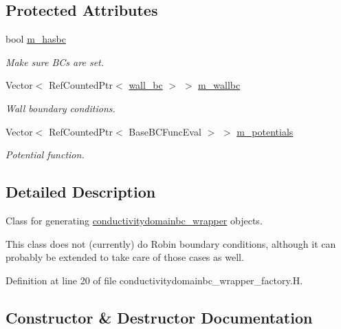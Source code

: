 \subsection*{Protected Attributes}
\begin{DoxyCompactItemize}
\item 
bool \hyperlink{classconductivitydomainbc__wrapper__factory_a7ca63b9cdbaefe3ca0a188818e65b295}{m\+\_\+hasbc}
\begin{DoxyCompactList}\small\item\em Make sure B\+Cs are set. \end{DoxyCompactList}\item 
Vector$<$ Ref\+Counted\+Ptr$<$ \hyperlink{classwall__bc}{wall\+\_\+bc} $>$ $>$ \hyperlink{classconductivitydomainbc__wrapper__factory_ae53d1a626f3d14a045eddbb20e28f723}{m\+\_\+wallbc}
\begin{DoxyCompactList}\small\item\em Wall boundary conditions. \end{DoxyCompactList}\item 
Vector$<$ Ref\+Counted\+Ptr$<$ Base\+B\+C\+Func\+Eval $>$ $>$ \hyperlink{classconductivitydomainbc__wrapper__factory_a58bfcbec50ffbb54076121621b30e71c}{m\+\_\+potentials}
\begin{DoxyCompactList}\small\item\em Potential function. \end{DoxyCompactList}\end{DoxyCompactItemize}


\subsection{Detailed Description}
Class for generating \hyperlink{classconductivitydomainbc__wrapper}{conductivitydomainbc\+\_\+wrapper} objects. 

This class does not (currently) do Robin boundary conditions, although it can probably be extended to take care of those cases as well. 

Definition at line 20 of file conductivitydomainbc\+\_\+wrapper\+\_\+factory.\+H.



\subsection{Constructor \& Destructor Documentation}
